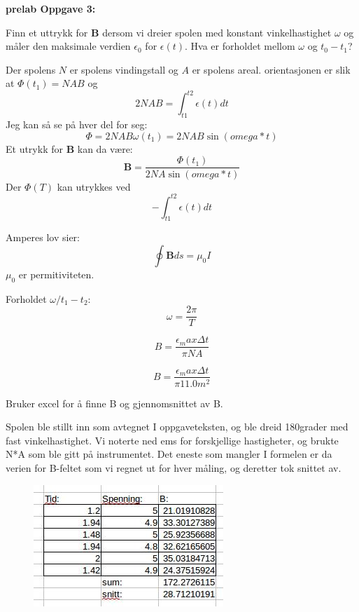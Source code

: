 \documentclass[12pt,a4paper,leqno]{report}
\begin{document}
\textbf{prelab Oppgave 3:} 

Finn et uttrykk for $\mathbf{B}$ dersom vi dreier spolen med konstant vinkelhastighet $\omega$ og måler den maksimale verdien $\epsilon_0$ for $\epsilon(t)$. Hva er forholdet mellom 
$\omega$ og $t_0-t_1$?

Der spolens $N$ er spolens vindingstall og $A$ er spolens areal.
orientasjonen er slik at $\Phi(t_1)=NAB$ og 
\begin{equation}
2NAB=\int_{t1}^{t2}\epsilon(t)dt
\end{equation}
Jeg kan så se på hver del for seg:
\begin{equation}
\Phi=2NAB\omega(t_1)=2NAB\sin(omega*t)
\end{equation}
Et utrykk for \textbf{B} kan da være:
\begin{equation}
\mathbf{B}=\frac{\Phi(t_1)}{2NA\sin(omega*t)}
\end{equation}
Der $\Phi(T)$ kan utrykkes ved
\begin{equation}
-\int_{t1}^{t2}\epsilon(t)dt
\end{equation}

Amperes lov sier:
\begin{equation}
\oint \mathbf{B} ds=\mu_0I
\end{equation}
$\mu_0$ er permitiviteten.

Forholdet $\omega/t_1-t_2$:
\begin{equation}
\omega=\frac{2 \pi} {T}
\end{equation}

\begin{equation}
B=\frac{\epsilon_max \Delta t} {\pi NA}
\end{equation}
	
\begin{equation}
B=\frac{\epsilon_max \Delta t} {\pi 11.0m^2}
\end{equation}

Bruker excel for å finne B og gjennomsnittet av B. 

Spolen ble stillt inn som avtegnet I oppgaveteksten, og ble dreid 180grader med fast vinkelhastighet. Vi noterte ned ems for forskjellige hastigheter, og brukte N*A som ble gitt på instrumentet. Det eneste som mangler I formelen er da verien for B-feltet som vi regnet ut for hver måling, og deretter tok snittet av.

\begin{figure}[H]
	\caption{}
	\centering
	\includegraphics[scale=1]{gjennomforing/oppgave5.jpg}
\end{figure}
		
\end{document}
